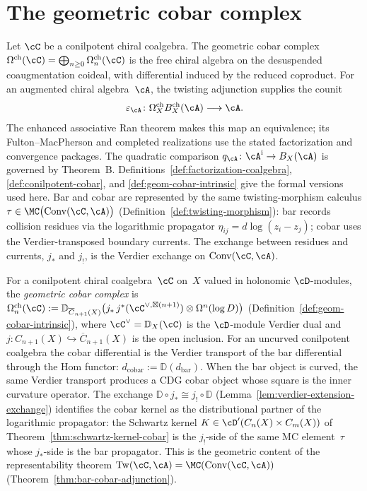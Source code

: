 \chapter{The geometric cobar complex}
\label{chap:cobar-construction}

\providecommand{\Bbarch}{\bar{B}^{\mathrm{ch}}}
\providecommand{\Omegach}{\Omega^{\mathrm{ch}}}
\providecommand{\barBch}{\bar{B}^{\mathrm{ch}}}
\providecommand{\Kosz}{\mathsf{Kosz}}
\providecommand{\co}{\mathrm{co}}

Let $\cC$ be a conilpotent chiral coalgebra.  The geometric cobar
complex
$\Omega^{\mathrm{ch}}(\cC)=\bigoplus_{n\geq0}
\Omega^{\mathrm{ch}}_n(\cC)$ is the free chiral algebra on the
desuspended coaugmentation coideal, with differential induced by the
reduced coproduct.  For an augmented chiral algebra~$\cA$, the
twisting adjunction supplies the counit
\[
\varepsilon_\cA\colon
\Omega_X^{\mathrm{ch}}B_X^{\mathrm{ch}}(\cA)\longrightarrow\cA.
\]
The enhanced associative Ran theorem makes this map an equivalence;
its Fulton--MacPherson and completed realizations use the stated
factorization and convergence packages.  The quadratic comparison
$q_\cA\colon\cA^{\mathrm i}\to B_X(\cA)$ is governed by Theorem~B.
Definitions~\ref{def:factorization-coalgebra},
\ref{def:conilpotent-cobar}, and
\ref{def:geom-cobar-intrinsic} give the formal versions used here.
Bar and cobar are represented by the same twisting-morphism calculus
$\tau \in \MC\bigl(\operatorname{Conv}(\cC, \cA)\bigr)$
(Definition~\ref{def:twisting-morphism}): bar records collision
residues via the logarithmic propagator
$\eta_{ij} = d\log(z_i - z_j)$; cobar uses the Verdier-transposed
boundary currents. The exchange between residues and currents,
$j_*$ and $j_!$, is the Verdier exchange on
$\operatorname{Conv}(\cC, \cA)$.

For a conilpotent chiral coalgebra~$\cC$ on~$X$ valued in holonomic
$\cD$-modules, the
\emph{geometric cobar complex} is
$\Omega^{\mathrm{ch}}_n(\cC)
:= \mathbb{D}_{\overline{C}_{n+1}(X)}
\bigl(j_*\, j^*(\cC^{\vee,\boxtimes(n+1)})
\otimes \Omega^n(\log D)\bigr)$
(Definition~\ref{def:geom-cobar-intrinsic}), where
$\cC^\vee = \mathbb{D}_X(\cC)$ is the $\cD$-module Verdier dual
and $j \colon C_{n+1}(X) \hookrightarrow \overline{C}_{n+1}(X)$
is the open inclusion. For an uncurved conilpotent coalgebra the cobar
differential is the Verdier transport of the bar differential through
the Hom functor:
$d_{\mathrm{cobar}} := \mathbb{D}(d_{\mathrm{bar}})$.
When the bar object is curved, the same Verdier transport produces a
CDG cobar object whose square is the inner curvature operator.
The exchange $\mathbb{D} \circ j_* \cong j_! \circ \mathbb{D}$
(Lemma~\ref{lem:verdier-extension-exchange}) identifies the
cobar kernel as the distributional partner of the logarithmic
propagator: the Schwartz kernel
$K \in \cD'(C_n(X) \times C_m(X))$ of
Theorem~\ref{thm:schwartz-kernel-cobar} is the $j_!$-side of the
same MC element~$\tau$ whose $j_*$-side is the bar propagator.
This is the geometric content of the representability theorem
$\operatorname{Tw}(\cC, \cA) = \MC(\operatorname{Conv}(\cC, \cA))$
(Theorem~\ref{thm:bar-cobar-adjunction}).

